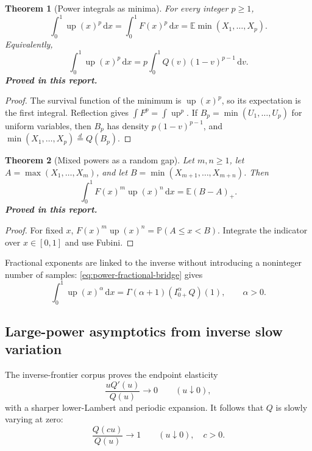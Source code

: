 \documentclass[11pt,oneside]{article}
\numberwithin{equation}{section}
\newtheorem{theorem}{Theorem}[section]
\theoremstyle{definition}
\theoremstyle{remark}
\newcommand{\Up}{\operatorname{up}}
\newcommand{\dd}{\,\mathrm d}
\newcommand{\E}{\mathbb E}
\newcommand{\Prob}{\mathbb P}
\newcommand{\QF}{Q}
\newcommand{\statusproved}{\textcolor{proofgreen}{\textbf{Proved in this report.}}}
\begin{document}
\begin{theorem}[Power integrals as minima]
\label{thm:power-minimum}
For every integer \(p\ge1\),
\begin{equation}
 \boxed{
 \int_0^1\Up(x)^p\dd x
 =\int_0^1F(x)^p\dd x
 =\E\min(X_1,\ldots,X_p).}
 \label{eq:power-minimum}
\end{equation}
Equivalently,
\begin{equation}
 \boxed{
 \int_0^1\Up(x)^p\dd x
 =p\int_0^1\QF(v)(1-v)^{p-1}\dd v.}
 \label{eq:power-beta-quantile}
\end{equation}
\statusproved
\end{theorem}

\begin{proof}
The survival function of the minimum is \(\Up(x)^p\), so its expectation is the
first integral.  Reflection gives \(\int F^p=\int\Up^p\).  If
\(B_p=\min(U_1,\ldots,U_p)\) for uniform variables, then
\(B_p\) has density \(p(1-v)^{p-1}\), and
\(\min(X_1,\ldots,X_p)\stackrel d=\QF(B_p)\).
\end{proof}

\begin{theorem}[Mixed powers as a random gap]
\label{thm:mixed-powers-gap}
Let \(m,n\ge1\), let
\(A=\max(X_1,\ldots,X_m)\), and let
\(B=\min(X_{m+1},\ldots,X_{m+n})\).  Then
\begin{equation}
 \boxed{
 \int_0^1F(x)^m\Up(x)^n\dd x=\E(B-A)_+.}
 \label{eq:mixed-gap}
\end{equation}
\statusproved
\end{theorem}

\begin{proof}
For fixed \(x\), \(F(x)^m\Up(x)^n=\Prob(A\le x<B)\).  Integrate the indicator
over \(x\in[0,1]\) and use Fubini.
\end{proof}

Fractional exponents are linked to the inverse without introducing a
noninteger number of samples: \eqref{eq:power-fractional-bridge} gives
\begin{equation}
 \int_0^1\Up(x)^\alpha\dd x
 =\Gamma(\alpha+1)(I_{0+}^{\alpha}\QF)(1),
 \qquad \alpha>0.
 \label{eq:power-alpha-Q}
\end{equation}

\subsection{Large-power asymptotics from inverse slow variation}

The inverse-frontier corpus proves the endpoint elasticity
\cite{proveitInverse}
\begin{equation}
 \frac{u\QF'(u)}{\QF(u)}\longrightarrow0
 \qquad(u\downarrow0),
 \label{eq:Q-elasticity-zero}
\end{equation}
with a sharper lower-Lambert and periodic expansion.  It follows that \(\QF\)
is slowly varying at zero:
\begin{equation}
 \frac{\QF(cu)}{\QF(u)}\longrightarrow1
 \qquad(u\downarrow0),\quad c>0.
 \label{eq:Q-slow-variation}
\end{equation}
\end{document}
